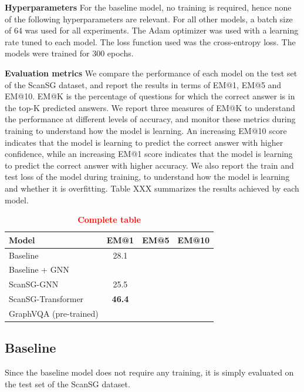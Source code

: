 \bigskip
\noindent \textbf{Hyperparameters}
For the baseline model, no training is required, hence none of the following hyperparameters are relevant. For all other models, a batch size of $64$ was used for all experiments. The Adam optimizer was used with a learning rate tuned to each model. The loss function used was the cross-entropy loss. The models were trained for $300$ epochs.

\bigskip
\noindent \textbf{Evaluation metrics}
We compare the performance of each model on the test set of the ScanSG dataset, and report the results in terms of EM@1, EM@5 and EM@10. EM@K is the percentage of questions for which the correct answer is in the top-K predicted answers. We report three measures of EM@K to understand the performance at different levels of accuracy, and monitor these metrics during training to understand how the model is learning. An increasing EM@10 score indicates that the model is learning to predict the correct answer with higher confidence, while an increasing EM@1 score indicates that the model is learning to predict the correct answer with higher accuracy.
We also report the train and test loss of the model during training, to understand how the model is learning and whether it is overfitting. Table XXX summarizes the results achieved by each model.

\begin{table}[h!]
    \centering
    \caption{\textcolor{red}{\textbf{Complete table}}}
    \begin{tabular}{|l|c|l|l|}
    \hline
    \textbf{Model}         & \textbf{EM@1} & \textbf{EM@5} & \textbf{EM@10} \\ \hline
    Baseline               & 28.1                   &               &                \\ \hline
    Baseline + GNN         & \multicolumn{1}{l|}{}  &               &                \\ \hline
    ScanSG-GNN             & 25.5                   &               &                \\ \hline
    ScanSG-Transformer     & \textbf{46.4}          &               &                \\ \hline
    GraphVQA (pre-trained) & \multicolumn{1}{l|}{}  &               &                \\ \hline
    \end{tabular}
\end{table}

\subsection{Baseline}
Since the baseline model does not require any training, it is simply evaluated on the test set of the ScanSG dataset.


